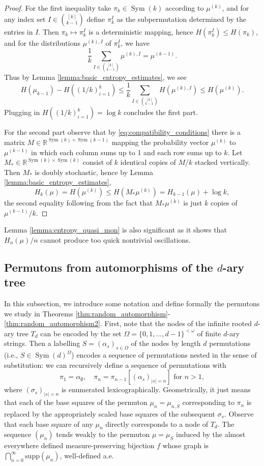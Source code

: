 \documentclass[11pt]{article}
\newcommand{\Sym}{\mathop{\mathrm{Sym}}}
\theoremstyle{definition}
\begin{document}
\begin{proof}
    For the first inequality take $\pi_k\in \Sym(k)$ according to $\mu^{(k)}$, and for any index set $I\in \binom{[k]}{k-1}$ define $\pi_k^{I}$ as the subpermutation determined by the entries in $I$. Then $\pi_k\mapsto\pi_k^{I}$ is a deterministic mapping, hence $H(\pi_k^{I})\leq H(\pi_k)$, and for the distributions $\mu^{(k),I}$ of $\pi_k^{I}$, we have 
    $$\frac{1}{k}\sum_{I\in\binom{[k]}{k-1}}\mu^{(k),I}=\mu^{(k-1)}.$$
    Thus by Lemma \ref{lemma:basic_entropy_estimates}, we see
    $$H(\mu_{k-1})- H((1/k)_{i=1}^{k})\leq \frac{1}{k}\sum_{I\in\binom{[k]}{k-1}}H(\mu^{(k),I})\leq H(\mu^{(k)}).$$
    Plugging in $H((1/k)_{i=1}^{k}) = \log k$ concludes the first part.

    For the second part observe that by \eqref{eq:compatibility_conditions} there is a matrix $M\in \mathbb{R}^{\Sym(k)\times \Sym(k-1)}$ mapping the probability vector $\mu^{(k)}$ to $\mu^{(k-1)}$ in which each column sums up to 1 and each row sums up to $k$. Let $M_*\in \mathbb{R}^{\Sym(k)\times \Sym(k)}$ consist of $k$ identical copies of $M/k$ stacked vertically. Then $M_*$ is doubly stochastic, hence by Lemma \ref{lemma:basic_entropy_estimates},
    $$H_k(\mu) = H(\mu^{(k)})\leq H(M_*\mu^{(k)}) = H_{k-1}(\mu) +\log k,$$
    the second equality following from the fact that $M_*\mu^{(k)}$ is just $k$ copies of $\mu^{(k-1)}/k$.
\end{proof}

Lemma \ref{lemma:entropy_quasi_mon} is also significant as it shows that $H_n(\mu)/n$ cannot produce too quick nontrivial oscillations.

\subsection{Permutons from automorphisms of the $d$-ary tree} \label{subsection:random_aut_notation}

In this subsection, we introduce some notation and define formally the permutons we study in Theorems \ref{thm:random_automorphism}-\ref{thm:random_automorphism2}. First, note that the nodes of the infinite rooted $d$-ary tree $T_d$ can be encoded by the set $\Omega=\{0, 1, \dots, d-1\}^{<\omega}$ of finite $d$-ary strings. Then a labelling $S=(\alpha_s)_{s\in\Omega}$ of the nodes by length $d$ permutations (i.e., $S\in \Sym(d)^{\Omega}$) encodes a sequence of permutations nested in the sense of substitution: we can recursively define a sequence of permutations with $$\pi_1=\alpha_{\emptyset}, \quad \pi_n= \pi_{n-1}[(\alpha_s)_{|s|=n}]\text{ for $n>1$},$$
where $(\sigma_s)_{|s|=n}$ is enumerated lexicographically. Geometrically, it just means that each of the base squares of the permuton $\mu_{n}=\mu_{n, S}$ corresponding to $\pi_n$ is replaced by the appropriately scaled base squares of the subsequent $\sigma_s$. Observe that each base square of any $\mu_n$ directly corresponds to a node of $T_d$. The sequence $(\mu_n)$ tends weakly to the permuton $\mu=\mu_S$ induced by the almost everywhere defined measure-preserving bijection $f$ whose graph is $\bigcap_{n=0}^{\infty}\mathrm{supp}(\mu_n)$, 
well-defined a.e.
\end{document}
